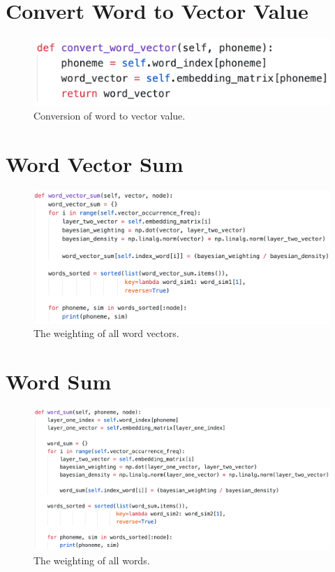 \section{Convert Word to Vector Value}
\begin{figure}[H]
    \centering
    \includegraphics[width=\textwidth]{figures/chapter-6/convertwordvector.png}
    \caption[Conversion of word to vector value]{Conversion of word to vector value.
    \label{fig:convertwordvector}}
\end{figure}

\section{Word Vector Sum}

\begin{figure}[H]
    \centering
    \includegraphics[width=\textwidth]{figures/chapter-6/wordvectorsum.png}
    \caption[The weighting of all word vectors]{The weighting of all word vectors.
    \label{fig:wordvectorsum}}
\end{figure}

\section{Word Sum}

\begin{figure}[H]
    \centering
    \includegraphics[width=\textwidth]{figures/chapter-6/wordsum.png}
    \caption[The weighting of all words]{The weighting of all words.
    \label{fig:wordsum}}
\end{figure}
